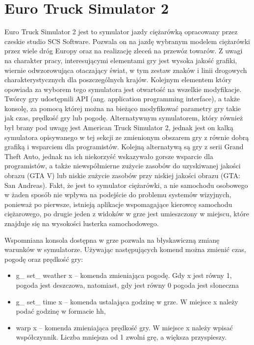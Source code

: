 \section{Euro Truck Simulator 2}
Euro Truck Simulator 2 jest to symulator jazdy ciężarówką opracowany przez czeskie studio SCS Software. Pozwala on na jazdę wybranym modelem ciężarówki przez wiele dróg Europy oraz na realizację zleceń na przewóz towarów. Z uwagi na charakter pracy, interesującymi elementami gry jest wysoka jakość grafiki, wiernie odwzorowująca otaczający świat, w tym zestaw znaków i linii drogowych charakterystycznych dla poszczególnych krajów. Kolejnym elementem który opowiada za wyborem tego symulatora jest otwartość na wszelkie modyfikacje. Twórcy gry udostępnili API (ang. application programming interface), a także konsolę, za pomocą której można na bieżąco modyfikować parametry gry takie jak czas, prędkość gry lub pogodę.
Alternatywnym symulatorem, który również był brany pod uwagę jest American Truck Simulator 2, jednak jest on kalką symulatora opisywanego w tej sekcji ze zmienionym obszarem gry z równie dobrą grafiką i wsparciem dla programistów. Kolejną alternatywą są gry z serii Grand Theft Auto, jednak na ich niekorzyść wskazywało gorsze wsparcie dla programistów, a także niewspółmierne zużycie zasobów do uzyskiwanej jakości obrazu (GTA V) lub niskie zużycie zasobów przy niskiej jakości obrazu (GTA: San Andreas). Fakt, że jest to symulator ciężarówki, a nie samochodu osobowego w żaden sposób nie wpływa na podejście do problemu systemów wizyjnych, ponieważ po pierwsze, istnieją aplikacje wspomagające kierowcę samochodu ciężarowego, po drugie jeden z widoków w grze jest umieszczony w miejscu, które znajduje się na wysokości lusterka samochodowego.

Wspomniana konsola dostępna w grze pozwala na błyskawiczną zmianę warunków w symulatorze. Używając następujących komend można zmienić czas, pogodę oraz prędkość gry:

\begin{itemize}
\item g\_ set\_ weather x -- komenda zmieniająca pogodę. Gdy x jest równy 1, pogoda jest deszczowa, natomiast, gdy jest równy 0 pogoda jest słoneczna
\item g\_ set\_ time x -- komenda ustalająca godzinę w grze. W miejsce x należy podać godzinę w formacie hh,
\item warp x -- komenda zmieniająca prędkość gry. W miejsce x należy wpisać współczynnik. Liczba mniejsza od 1 zwolni grę, a większa przyspieszy.
\end{itemize}

